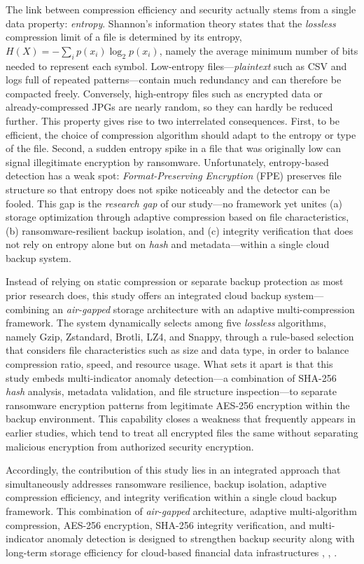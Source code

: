 \documentclass{iaesarticle}
\begin{document}
The link between compression efficiency and security actually stems from a single data property: \textit{entropy}. Shannon's information theory states that the \textit{lossless} compression limit of a file is determined by its entropy, $H(X) = -\sum_{i} p(x_i)\log_2 p(x_i)$, namely the average minimum number of bits needed to represent each symbol. Low-entropy files---\textit{plaintext} such as CSV and logs full of repeated patterns---contain much redundancy and can therefore be compacted freely. Conversely, high-entropy files such as encrypted data or already-compressed JPGs are nearly random, so they can hardly be reduced further. This property gives rise to two interrelated consequences. First, to be efficient, the choice of compression algorithm should adapt to the entropy or type of the file. Second, a sudden entropy spike in a file that was originally low can signal illegitimate encryption by ransomware. Unfortunately, entropy-based detection has a weak spot: \textit{Format-Preserving Encryption} (FPE) preserves file structure so that entropy does not spike noticeably and the detector can be fooled. This gap is the \textit{research gap} of our study---no framework yet unites (a) storage optimization through adaptive compression based on file characteristics, (b) ransomware-resilient backup isolation, and (c) integrity verification that does not rely on entropy alone but on \textit{hash} and metadata---within a single cloud backup system.

Instead of relying on static compression or separate backup protection as most prior research does, this study offers an integrated cloud backup system---combining an \textit{air-gapped} storage architecture with an adaptive multi-compression framework. The system dynamically selects among five \textit{lossless} algorithms, namely Gzip, Zstandard, Brotli, LZ4, and Snappy, through a rule-based selection that considers file characteristics such as size and data type, in order to balance compression ratio, speed, and resource usage. What sets it apart is that this study embeds multi-indicator anomaly detection---a combination of SHA-256 \textit{hash} analysis, metadata validation, and file structure inspection---to separate ransomware encryption patterns from legitimate AES-256 encryption within the backup environment. This capability closes a weakness that frequently appears in earlier studies, which tend to treat all encrypted files the same without separating malicious encryption from authorized security encryption.

Accordingly, the contribution of this study lies in an integrated approach that simultaneously addresses ransomware resilience, backup isolation, adaptive compression efficiency, and integrity verification within a single cloud backup framework. This combination of \textit{air-gapped} architecture, adaptive multi-algorithm compression, AES-256 encryption, SHA-256 integrity verification, and multi-indicator anomaly detection is designed to strengthen backup security along with long-term storage efficiency for cloud-based financial data infrastructures \cite{18}, \cite{19}, \cite{20}.
\end{document}
